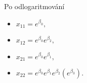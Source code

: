 \documentclass[landscape,a0paper,fontscale=0.285]{baposter} %
\begin{document}
\begin{poster}
{Po odlogaritmování

\begin{itemize}
\item $x_{11}=e^{\beta_{0}},$
\item $x_{12}=e^{\beta_{0}}e^{\beta_{2}},$
\item $x_{21}=e^{\beta_{0}}e^{\beta_{1}},$
\item $x_{22}=e^{\beta_{0}}e^{\beta_{1}}e^{\beta_{2}}(e^{\beta_{3}}).$
\end{itemize}
}
\end{poster}
\end{document}
